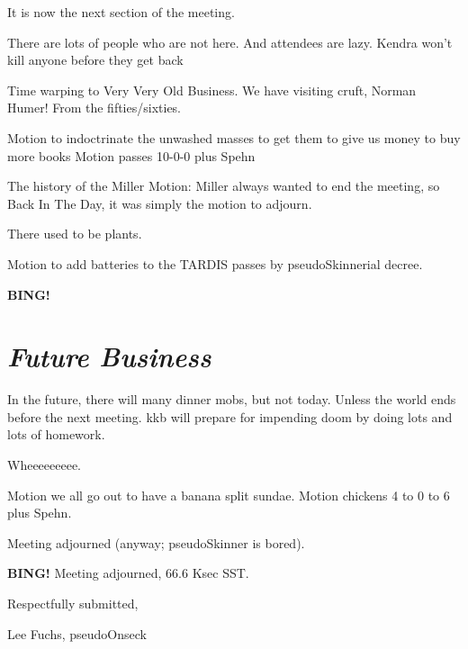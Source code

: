 \documentclass[10pt]{article}
\newcommand{\bing}{{\bf BING!} }
\newcommand{\goto}[1]{\bing \vskip 12pt \section*{{\em{#1}}}}
\begin{document}
It is now the next section of the meeting.

There are lots of people who are not here. And attendees are lazy. Kendra won't kill anyone before they get back

Time warping to Very Very Old Business.  We have visiting cruft, Norman Humer! From the fifties/sixties.

Motion to indoctrinate the unwashed masses to get them to give us money to buy more books
Motion passes 10-0-0 plus Spehn

The history of the Miller Motion: Miller always wanted to end the meeting, so Back In The Day, it was simply the motion to adjourn.

There used to be plants.

Motion to add batteries to the TARDIS passes by pseudoSkinnerial decree.

\goto{Future Business}

In the future, there will many dinner mobs, but not today. Unless the world ends before the next meeting. kkb will prepare for impending doom by doing lots and lots of homework.

Wheeeeeeeee.

Motion we all go out to have a banana split sundae.
Motion chickens 4 to 0 to 6 plus Spehn.

Meeting adjourned (anyway; pseudoSkinner is bored).

\bing
\noindent
Meeting adjourned, 66.6 Ksec SST.

\vspace{18pt}

\centerline{Respectfully submitted,}
\centerline{Lee Fuchs, pseudoOnseck}
\end{document}
